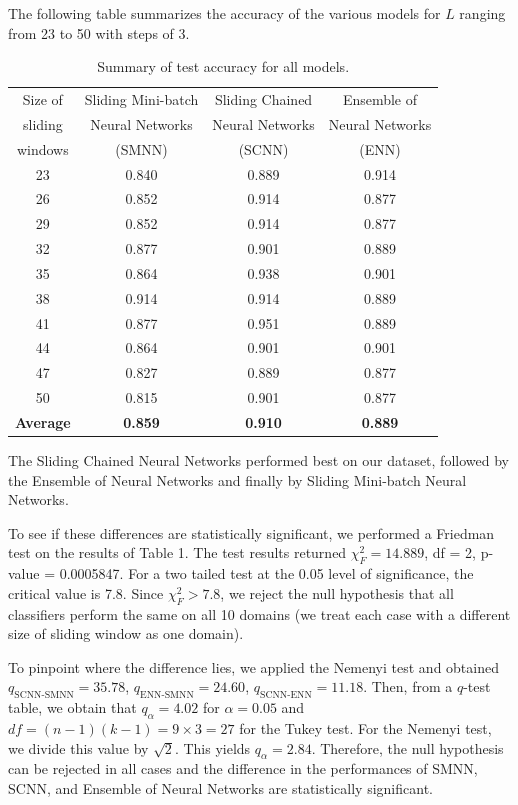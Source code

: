 \documentclass[conference]{IEEEtran}
\begin{document}
		The following table summarizes the accuracy of the various models for $L$ ranging from 23 to 50 with steps of 3.
		\begin{table}[H]
			\centering
			\begin{tabular}{cccc}
				\hline
				Size of&  Sliding Mini-batch &  Sliding Chained &Ensemble of \\
				sliding& Neural Networks & Neural Networks & Neural Networks\\
				windows&  (SMNN) & (SCNN) & (ENN) \\
				\hline
				23 & 0.840 & 0.889 & 0.914 \\ 
				26 & 0.852 & 0.914 & 0.877 \\ 
				29 & 0.852 & 0.914 & 0.877 \\ 
				32 & 0.877 & 0.901 & 0.889 \\ 
				35 & 0.864 & 0.938 & 0.901 \\ 
				38 & 0.914 & 0.914 & 0.889 \\ 
				41 & 0.877 & 0.951 & 0.889 \\ 
				44 & 0.864 & 0.901 & 0.901 \\ 
				47 & 0.827 & 0.889 & 0.877 \\ 
				50 & 0.815 & 0.901 & 0.877 \\ 
				\hline
				\textbf{Average} & \textbf{0.859} &\textbf{0.910} & \textbf{0.889} \\
				\hline
			\end{tabular}
			\caption{Summary of test accuracy for all models.}
		\end{table}
		
		The Sliding Chained Neural Networks performed best on our dataset, followed by the Ensemble of Neural Networks and finally by Sliding Mini-batch Neural Networks.
		
		To see if these differences are statistically significant, we performed a Friedman test on the results of Table 1. The test results returned $\chi^2_F= 14.889$, df = 2, p-value = 0.0005847. For a two tailed test at the 0.05 level of significance, the critical value is 7.8. Since $\chi_F^2 >7.8$, we reject the null hypothesis that all classifiers perform the same on all 10 domains (we treat each case with a different size of sliding window as one domain).
		  
		To pinpoint where the difference lies, we applied the Nemenyi test and obtained $q_{\text{SCNN-SMNN}}= 35.78$,  $q_{\text{ENN-SMNN}}=24.60$, $q_{\text{SCNN-ENN}}=11.18$.
		Then, from a $q$-test table, we obtain that $q_\alpha=4.02$ for $\alpha=0.05$ and $df = (n-1)(k-1) = 9 \times 3 = 27$ for the Tukey test. For the Nemenyi test, we divide this value by $\sqrt{2}$. This yields $q_\alpha = 2.84$. Therefore, the null hypothesis can be rejected in all cases and the difference in the performances of SMNN, SCNN, and Ensemble of Neural Networks are statistically significant.
		
\end{document}
